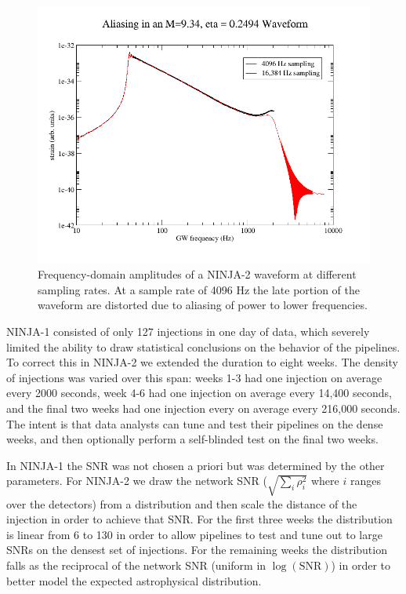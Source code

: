 \begin{figure}
  \includegraphics[width=\linewidth]{figures/ninja2_results/ninja2_aliasing}
  \caption[Aliasing of waveform power]{
  \label{f:ninja2_aliasing}
Frequency-domain amplitudes of a NINJA-2 waveform at different
sampling rates.  At a sample rate of 4096 Hz the late portion of the
waveform are distorted due to aliasing of power to lower frequencies.
}
\end{figure}%
%
NINJA-1 consisted of only 127 injections in one day of data, which
severely limited the ability to draw statistical conclusions on the
behavior of the pipelines.  To correct this in NINJA-2 we extended the
duration to eight weeks.  The density of injections was varied over
this span:  weeks 1-3 had one injection on average every 2000 seconds,
week 4-6 had one injection on average every 14,400 seconds, and the
final two weeks had one injection every on average every 216,000
seconds.  The intent is that data analysts can tune and test their
pipelines on the dense weeks, and then optionally perform a
self-blinded test on the final two weeks.

In NINJA-1 the SNR was not chosen a priori but was determined by the
other parameters.  For NINJA-2 we draw the network SNR ($\sqrt{\sum_i
\rho_i^2}$ where $i$ ranges over the detectors) from a distribution and
then scale the distance of the injection in order to achieve that SNR.
For the first three weeks the distribution is linear from 6 to 130 in
order to allow pipelines to test and tune out to large SNRs on the
densest set of injections.  For the remaining weeks the distribution
falls as the reciprocal of the network SNR (uniform in
$\log(\mathrm{SNR})$) in order to better model the expected
astrophysical distribution.

